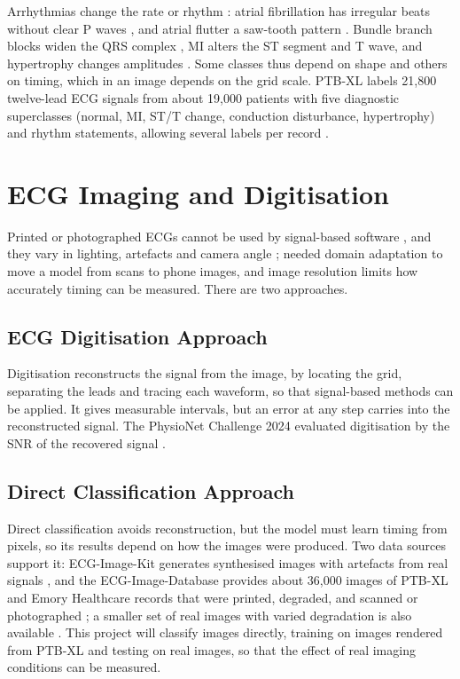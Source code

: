 Arrhythmias change the rate or rhythm \cite{nhs_heart_2018}: atrial fibrillation has irregular beats without clear P waves \cite{van_gelder_2024_2024}, and atrial flutter a saw-tooth pattern \cite{cosio_atrial_2017}. Bundle branch blocks widen the QRS complex \cite{scherbak_left_2024}, MI alters the ST segment and T wave, and hypertrophy changes amplitudes \cite{channer_myocardial_2002}. Some classes thus depend on shape and others on timing, which in an image depends on the grid scale. PTB-XL labels 21,800 twelve-lead ECG signals from about 19,000 patients with five diagnostic superclasses (normal, MI, ST/T change, conduction disturbance, hypertrophy) and rhythm statements, allowing several labels per record \cite{wagner_ptbxl_2020}.

\section{ECG Imaging and Digitisation}
\label{sec:ecg-imaging}

Printed or photographed ECGs cannot be used by signal-based software \cite{shivashankara_ecg-image-kit_2024}, and they vary in lighting, artefacts and camera angle \cite{reyna_ecg-image-database_2024}; \textcite{gliner_domain_2023} needed domain adaptation to move a model from scans to phone images, and image resolution limits how accurately timing can be measured. There are two approaches.

\subsection{ECG Digitisation Approach}
\label{sec:digitisation}

Digitisation reconstructs the signal from the image, by locating the grid, separating the leads and tracing each waveform, so that signal-based methods can be applied. It gives measurable intervals, but an error at any step carries into the reconstructed signal. The PhysioNet Challenge 2024 evaluated digitisation by the SNR of the recovered signal \cite{physionet_challenge_2024}.

\subsection{Direct Classification Approach}
\label{sec:direct-classification}

Direct classification avoids reconstruction, but the model must learn timing from pixels, so its results depend on how the images were produced. Two data sources support it: ECG-Image-Kit generates synthesised images with artefacts from real signals \cite{shivashankara_ecg-image-kit_2024}, and the ECG-Image-Database provides about 36,000 images of PTB-XL and Emory Healthcare records that were printed, degraded, and scanned or photographed \cite{reyna_ecg-image-database_2024}; a smaller set of real images with varied degradation is also available \cite{khan_ecg_2021}. This project will classify images directly, training on images rendered from PTB-XL and testing on real images, so that the effect of real imaging conditions can be measured.

